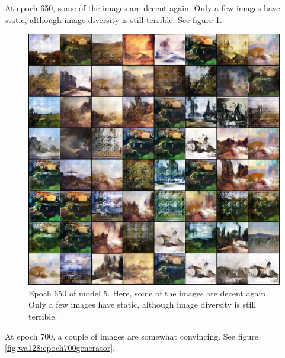 \documentclass[11pt,letterpaper]{article}
\begin{document}
				At epoch 650, some of the images are decent again.
				Only a few images have static, although image diversity is still terrible.
				See figure \ref{fig:wa128:epoch650generator}.
				\begin{figure}
					\centering
					\includegraphics[width=1.0\linewidth]{results/model5/epoch650_generator}
					\caption{Epoch 650 of model 5. Here, some of the images are decent again. Only a few images have static, although image diversity is still terrible.}
					\label{fig:wa128:epoch650generator}
				\end{figure}

				At epoch 700, a couple of images are somewhat convincing.
				See figure \ref{fig:wa128:epoch700generator}.
\end{document}
